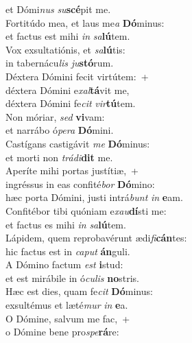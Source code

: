 \oddverse et Dómi\textit{nus} \textit{su}\textbf{scé}pit me.\\
\evenverse Fortitúdo mea, et laus me\textit{a} \textbf{Dó}minus:~\*\\
\evenverse et factus est mihi \textit{in} \textit{sa}\textbf{lú}tem.\\
\oddverse Vox exsultatiónis, et \textit{sa}\textbf{lú}tis:~\*\\
\oddverse in tabernácu\textit{lis} \textit{ju}\textbf{stó}rum.\\
\evenverse Déxtera Dómini fecit virtútem:~+\\
\evenverse  déxtera Dómini e\textit{xal}\textbf{tá}vit me,~\*\\
\evenverse déxtera Dómini fe\textit{cit} \textit{vir}\textbf{tú}tem.\\
\oddverse Non móriar, \textit{sed} \textbf{vi}vam:~\*\\
\oddverse et narrábo ó\textit{pe}\textit{ra} \textbf{Dó}mini.\\
\evenverse Castígans castigávit \textit{me} \textbf{Dó}minus:~\*\\
\evenverse et morti non \textit{trá}\textit{di}\textbf{dit} me.\\
\oddverse Aperíte mihi portas justítiæ,~+\\
\oddverse  ingréssus in eas confité\textit{bor} \textbf{Dó}mino:~\*\\
\oddverse hæc porta Dómini, justi intrá\textit{bunt} \textit{in} \textbf{e}am.\\
\evenverse Confitébor tibi quóniam e\textit{xau}\textbf{dí}sti me:~\*\\
\evenverse et factus es mihi \textit{in} \textit{sa}\textbf{lú}tem.\\
\oddverse Lápidem, quem reprobavérunt ædi\textit{fi}\textbf{cán}tes:~\*\\
\oddverse hic factus est in \textit{ca}\textit{put} \textbf{án}guli.\\
\evenverse A Dómino factum \textit{est} \textbf{i}stud:~\*\\
\evenverse et est mirábile in ó\textit{cu}\textit{lis} \textbf{no}stris.\\
\oddverse Hæc est dies, quam fe\textit{cit} \textbf{Dó}minus:~\*\\
\oddverse exsultémus et læté\textit{mur} \textit{in} \textbf{e}a.\\
\evenverse O Dómine, salvum me fac,~+\\
\evenverse  o Dómine bene pro\textit{spe}\textbf{rá}re:~\*\\
